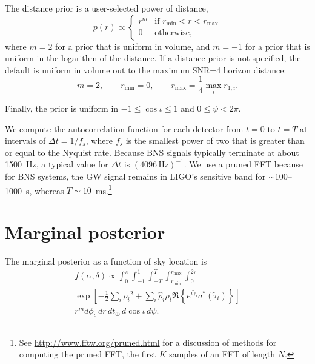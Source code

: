 \documentclass[amsmath,amssymb,aps,prx,reprint,nopreprintnumbers,nofootinbib,showpacs]{revtex4-1}
\begin{document}
The distance prior is a user-selected power of distance,
%
\begin{equation*}
    p(r) \propto \begin{cases}
        r^m & \text{if } r_\mathrm{min} < r < r_\mathrm{max} \\
        0 & \text{otherwise},
    \end{cases}
\end{equation*}
%
where $m=2$ for a prior that is uniform in volume, and $m=-1$ for a prior that is uniform in the logarithm of the distance. If a distance prior is not specified, the default is uniform in volume out to the maximum SNR=4 horizon distance:
%
\begin{equation*}
    m = 2,
    \qquad
    r_\mathrm{min} = 0,
    \qquad
    r_\mathrm{max} = \frac{1}{4} \max_i r_{1,i}.
\end{equation*}

Finally, the prior is uniform in $-1 \leq \cos\iota \leq 1$ and $0 \leq \psi < 2\pi$.

We compute the autocorrelation function for each detector from $t = 0$ to $t = T$ at intervals of $\Delta t = 1/f_s$, where $f_s$ is the smallest power of two that is greater than or equal to the Nyquist rate. Because BNS signals typically terminate at about 1500~Hz, a typical value for $\Delta t$ is $(4096\,\textrm{Hz})^{-1}$. We use a pruned \ac{FFT} because for BNS systems, the \ac{GW} signal remains in LIGO's sensitive band for $\sim$100\nobreakdashes--1000~s, whereas $T \sim 10$~ms.\footnote{See \url{http://www.fftw.org/pruned.html} for a discussion of methods for computing the pruned \ac{FFT}, the first $K$ samples of an \ac{FFT} of length $N$.}

\section{Marginal posterior}
\label{sec:marginal-posterior}

The marginal posterior as a function of sky location is
%
\begin{multline}
    f(\alpha, \delta) \propto
    \int_{0}^{\pi}
    \int_{-1}^{1}
    \int_{-T}^{T}
    \int_{r_\mathrm{min}}^{r_\mathrm{max}}
    \int_{0}^{2\pi}
    \\
    \exp \left[ - \frac{1}{2} \sum_i {\rho_i}^2
        + \sum_i \hat\rho_i \rho_i \Re \left\{ e^{i \tilde{\gamma}_i}
        a^*(\tilde{\tau}_i)
        \right\}
    \right] \\
    r^m d\phi_c \, dr \, dt_\oplus \, d\cos{\iota} \, d\psi.
\end{multline}
\end{document}
